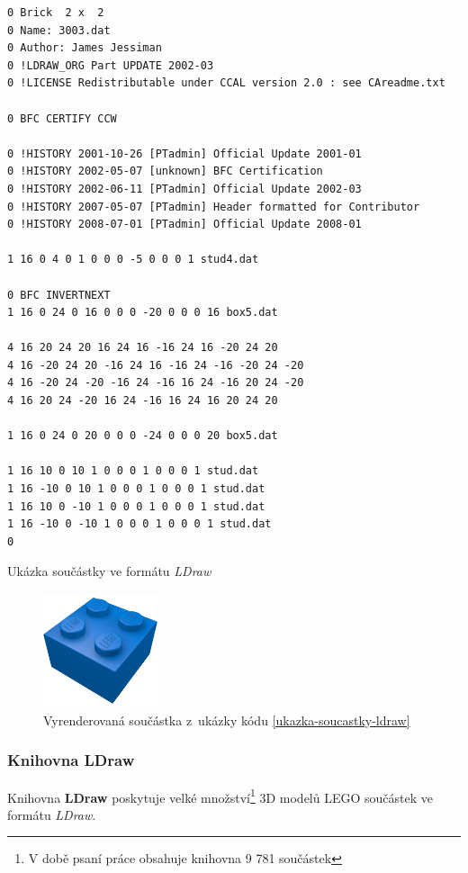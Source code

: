        \begin{listing}[htbp]
            \begin{verbatim}
0 Brick  2 x  2
0 Name: 3003.dat
0 Author: James Jessiman
0 !LDRAW_ORG Part UPDATE 2002-03
0 !LICENSE Redistributable under CCAL version 2.0 : see CAreadme.txt

0 BFC CERTIFY CCW

0 !HISTORY 2001-10-26 [PTadmin] Official Update 2001-01
0 !HISTORY 2002-05-07 [unknown] BFC Certification
0 !HISTORY 2002-06-11 [PTadmin] Official Update 2002-03
0 !HISTORY 2007-05-07 [PTadmin] Header formatted for Contributor
0 !HISTORY 2008-07-01 [PTadmin] Official Update 2008-01

1 16 0 4 0 1 0 0 0 -5 0 0 0 1 stud4.dat

0 BFC INVERTNEXT
1 16 0 24 0 16 0 0 0 -20 0 0 0 16 box5.dat

4 16 20 24 20 16 24 16 -16 24 16 -20 24 20
4 16 -20 24 20 -16 24 16 -16 24 -16 -20 24 -20
4 16 -20 24 -20 -16 24 -16 16 24 -16 20 24 -20
4 16 20 24 -20 16 24 -16 16 24 16 20 24 20

1 16 0 24 0 20 0 0 0 -24 0 0 0 20 box5.dat

1 16 10 0 10 1 0 0 0 1 0 0 0 1 stud.dat
1 16 -10 0 10 1 0 0 0 1 0 0 0 1 stud.dat
1 16 10 0 -10 1 0 0 0 1 0 0 0 1 stud.dat
1 16 -10 0 -10 1 0 0 0 1 0 0 0 1 stud.dat
0
            \end{verbatim}
            \caption{Ukázka součástky ve formátu \textit{LDraw} \autocite{ldraw:model}\label{ukazka-soucastky-ldraw}}
        \end{listing}
  
        \begin{figure}[htbp]
            \centering
            \includegraphics[width=0.3\textwidth,height=\textheight,keepaspectratio]{images/3003.png}
            \caption{Vyrenderovaná součástka z~ukázky kódu \ref{ukazka-soucastky-ldraw} \autocite{rebrickable:part:image:3003}\label{obrazek-ldraw-soucastka}}
        \end{figure}

    \subsubsection{Knihovna LDraw}\label{ldraw-knihovna}
    Knihovna \textbf{LDraw} poskytuje velké množství\footnote{V době psaní práce obsahuje knihovna 9 781 součástek} 3D modelů LEGO součástek ve formátu \textit{LDraw}.

